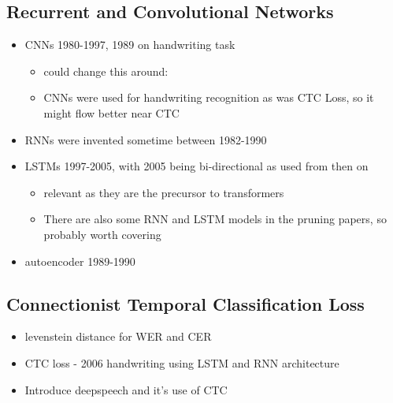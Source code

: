 \subsection{Recurrent and Convolutional Networks}
\begin{itemize}
    \item CNNs 1980-1997, 1989 on handwriting task 
    \begin{itemize}
        \item could change this around:
        \item CNNs were used for handwriting recognition as was CTC Loss, so it might flow better near CTC
    \end{itemize}
    \item RNNs were invented sometime between 1982-1990
    \item LSTMs 1997-2005, with 2005 being bi-directional as used from then on
    \begin{itemize}
        \item relevant as they are the precursor to transformers
        \item There are also some RNN and LSTM models in the pruning papers, so probably worth covering
    \end{itemize}
    \item autoencoder 1989-1990
\end{itemize}

\subsection{Connectionist Temporal Classification Loss}
\begin{itemize}
    \item levenstein distance for WER and CER
    \item CTC loss - 2006 handwriting using LSTM and RNN architecture
    \item Introduce deepspeech and it's use of CTC
\end{itemize}



